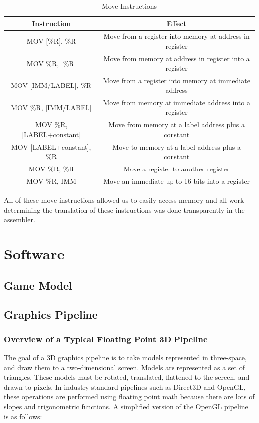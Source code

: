 \documentclass[onecolumn]{IEEEtran}
\begin{document}
\begin{table}[H]
	\centering
	\label{tab:moveTypes}
	\caption{Move Instructions}
	\begin{tabular}{ c c }
	\hline
	Instruction               & Effect \\ \hline
	MOV [\%R], \%R            & Move from a register into memory at address in register \\
	MOV \%R, [\%R]            & Move from memory at address in register into a register \\	
	MOV [IMM/LABEL], \%R      & Move from a register into memory at immediate address \\ 
	MOV \%R, [IMM/LABEL]      & Move from memory at immediate address into a register \\  
	MOV \%R, [LABEL+constant] & Move from memory at a label address plus a constant \\  
	MOV [LABEL+constant], \%R & Move to memory at a label address plus a constant \\  
	MOV \%R, \%R              & Move a register to another register \\  
	MOV \%R, IMM              & Move an immediate up to 16 bits into a register \\  
	\hline
	\end{tabular}
\end{table}

All of these move instructions allowed us to easily access memory and all work determining the translation of these instructions was done transparently in the assembler.

\section{Software}
\subsection{Game Model}

\subsection{Graphics Pipeline}
\subsubsection{Overview of a Typical Floating Point 3D Pipeline}
  The goal of a 3D graphics pipeline is to take models represented in three-space, and draw them to a two-dimensional screen.  Models are represented as a set of triangles.  These models must be rotated, translated, flattened to the screen, and drawn to pixels.  In industry standard pipelines such as Direct3D and OpenGL, these operations are performed using floating point math because there are lots of slopes and trigonometric functions.  A simplified version of the OpenGL pipeline is as follows:
\end{document}
